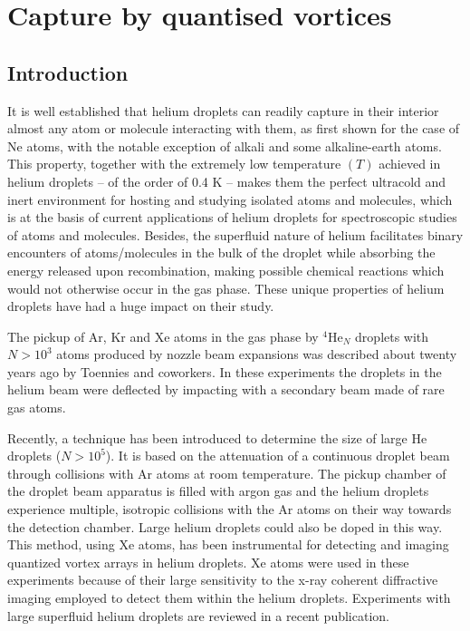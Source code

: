 \chapter{Capture by quantised vortices}
	\section{Introduction}
		It is well established that helium droplets can readily capture in their interior almost any atom or molecule interacting with them, as first shown for the case of Ne atoms,\cite{Sch90} with the notable exception of alkali\cite{Sti96} and some alkaline-earth\cite{Her07} atoms. This property, together with the extremely low temperature $(T)$ achieved in helium droplets -- of the order of 0.4 K -- makes them the perfect ultracold and inert environment for hosting and studying isolated atoms and molecules, which is at the basis of current applications of helium droplets for spectroscopic studies of atoms and molecules. Besides, the superfluid nature of helium facilitates binary encounters of atoms/molecules in the bulk of the droplet while absorbing the energy released upon recombination, making possible chemical reactions which would not otherwise occur in the gas phase. These unique properties  of helium droplets have had a huge impact on their study.\cite{Toe04,Sti06,Tig07,Cal11a,Mud14}

The pickup of Ar, Kr and Xe atoms in the gas phase by $^4$He$_N$ droplets 
with $N> 10^3$ atoms produced by nozzle beam expansions 
was described about twenty years ago by Toennies and coworkers.\cite{Lew95} 
In these experiments the droplets in the helium beam were deflected by 
impacting with a secondary beam made of rare gas atoms. 

Recently, a technique has been introduced to determine the size of 
large He droplets ($N> 10^5$). It is based on the attenuation of a continuous  
droplet beam through collisions with Ar atoms at room temperature.\cite{Gom11} 
The pickup chamber of the droplet beam apparatus is filled with argon 
gas and the helium droplets experience multiple, isotropic collisions with the Ar 
atoms on their way towards the detection chamber. 
%
Large helium droplets 
could also be doped in this way. This method, using Xe atoms,
has been instrumental for detecting and imaging quantized vortex 
arrays in helium droplets.\cite{Gom14,Jon16}  Xe 
atoms were used in these experiments because of their large
sensitivity to the x-ray coherent diffractive imaging employed 
to detect them within the helium droplets. Experiments with large superfluid helium droplets 
are reviewed in a recent publication.\cite{Tan17}


